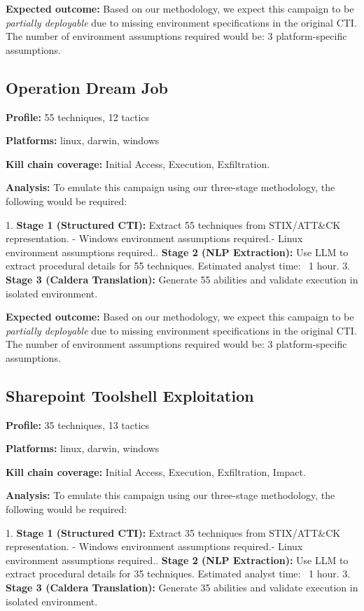 \textbf{Expected outcome:} Based on our methodology, we expect this campaign
to be \textit{partially deployable} due to missing environment specifications
in the original CTI. The number of environment assumptions required would be:
3 platform-specific assumptions.



\subsection*{Operation Dream Job}

\textbf{Profile:} 55 techniques, 12 tactics

\textbf{Platforms:} linux, darwin, windows

\textbf{Kill chain coverage:}
Initial Access, Execution, Exfiltration.

\textbf{Analysis:} To emulate this campaign using our three-stage methodology,
the following would be required:

1. \textbf{Stage 1 (Structured CTI):} Extract 55 techniques
   from STIX/ATT&CK representation.
   - Windows environment assumptions required.\n   - Linux environment assumptions required.. \textbf{Stage 2 (NLP Extraction):} Use LLM to extract procedural details
   for 55 techniques. Estimated analyst time: ~1 hour.
3. \textbf{Stage 3 (Caldera Translation):} Generate 55
   abilities and validate execution in isolated environment.

\textbf{Expected outcome:} Based on our methodology, we expect this campaign
to be \textit{partially deployable} due to missing environment specifications
in the original CTI. The number of environment assumptions required would be:
3 platform-specific assumptions.



\subsection*{Sharepoint Toolshell Exploitation}

\textbf{Profile:} 35 techniques, 13 tactics

\textbf{Platforms:} linux, darwin, windows

\textbf{Kill chain coverage:}
Initial Access, Execution, Exfiltration, Impact.

\textbf{Analysis:} To emulate this campaign using our three-stage methodology,
the following would be required:

1. \textbf{Stage 1 (Structured CTI):} Extract 35 techniques
   from STIX/ATT&CK representation.
   - Windows environment assumptions required.\n   - Linux environment assumptions required.. \textbf{Stage 2 (NLP Extraction):} Use LLM to extract procedural details
   for 35 techniques. Estimated analyst time: ~1 hour.
3. \textbf{Stage 3 (Caldera Translation):} Generate 35
   abilities and validate execution in isolated environment.

